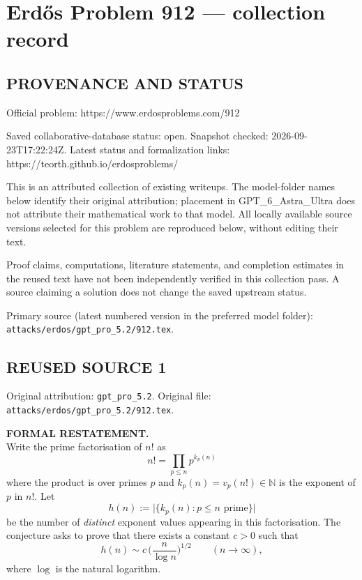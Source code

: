 \section*{Erd\H{o}s Problem 912 --- collection record}

\subsection*{PROVENANCE AND STATUS}
Official problem: https://www.erdosproblems.com/912

Saved collaborative-database status: open.
Snapshot checked: 2026-09-23T17:22:24Z.
Latest status and formalization links: https://teorth.github.io/erdosproblems/

This is an attributed collection of existing writeups. The model-folder names below identify their original attribution; placement in GPT\_6\_Astra\_Ultra does not attribute their mathematical work to that model. All locally available source versions selected for this problem are reproduced below, without editing their text.

Proof claims, computations, literature statements, and completion estimates in the reused text have not been independently verified in this collection pass. A source claiming a solution does not change the saved upstream status.

Primary source (latest numbered version in the preferred model folder): \texttt{attacks/erdos/gpt\_pro\_5.2/912.tex}.

\subsection*{REUSED SOURCE 1}
Original attribution: \texttt{gpt\_pro\_5.2}.
Original file: \texttt{attacks/erdos/gpt\_pro\_5.2/912.tex}.


\noindent\textbf{FORMAL RESTATEMENT.}\\
Write the prime factorisation of $n!$ as
\[
 n! = \prod_{p\le n} p^{k_p(n)}
\]
where the product is over primes $p$ and $k_p(n)=v_p(n!)\in\mathbb{N}$ is the exponent of $p$ in $n!$. Let
\[
 h(n):=\big|\{k_p(n): p\le n\text{ prime}\}\big|
\]
be the number of \emph{distinct} exponent values appearing in this factorisation. The conjecture asks to prove that there exists a constant $c>0$ such that
\[
 h(n) \sim c\,\Big(\frac{n}{\log n}\Big)^{1/2}\qquad (n\to\infty),
\]
where $\log$ is the natural logarithm.

